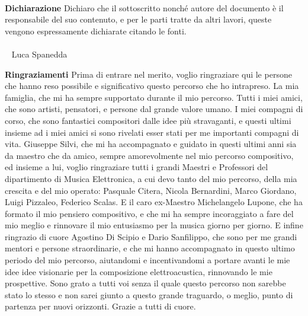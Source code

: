 \documentclass[12pt]{article}
\begin{document}


\newpage
\
\newpage

\vfill
\LARGE \textbf{Dichiarazione} \normalsize \newline \newline
Dichiaro che il sottoscritto nonché autore del
documento è il responsabile del suo contenuto,
e per le parti tratte da altri lavori,
queste vengono espressamente dichiarate
citando le fonti. \\  \\
\
\hspace*{\fill} \large Luca Spanedda \normalsize
\
\newpage

\vfill
\LARGE \textbf{Ringraziamenti} \normalsize \newline \newline
Prima di entrare nel merito, voglio ringraziare qui le persone
che hanno reso possibile e significativo questo percorso che ho intrapreso.
La mia famiglia, che mi ha sempre supportato durante il mio percorso.
Tutti i miei amici, che sono artisti, pensatori, e persone dal grande valore umano.
I miei compagni di corso, che sono fantastici compositori dalle idee più stravaganti,
e questi ultimi insieme ad i miei amici si sono rivelati esser
stati per me importanti compagni di vita.
Giuseppe Silvi, che mi ha accompagnato e guidato in questi ultimi anni sia da maestro
che da amico, sempre amorevolmente nel mio percorso compositivo,
ed insieme a lui, voglio ringraziare tutti i grandi Maestri e Professori
del dipartimento di Musica Elettronica,
a cui devo tanto del mio percorso, della mia crescita e del mio operato:
Pasquale Citera, Nicola Bernardini, Marco Giordano, Luigi Pizzaleo, Federico Scalas.
E il caro ex-Maestro Michelangelo Lupone, che ha formato il mio pensiero compositivo,
e che mi ha sempre incoraggiato a fare del mio meglio e rinnovare il mio entusiasmo
per la musica giorno per giorno.
E infine ringrazio di cuore Agostino Di Scipio e Dario Sanfilippo,
che sono per me grandi mentori e persone straordinarie,
e che mi hanno accompagnato in questo ultimo periodo del mio percorso,
aiutandomi e incentivandomi a portare avanti le
mie idee idee visionarie per la composizione elettroacustica,
rinnovando le mie prospettive.
Sono grato a tutti voi senza il quale questo percorso non sarebbe stato lo stesso
e non sarei giunto a questo grande traguardo,
o meglio, punto di partenza per nuovi orizzonti.
Grazie a tutti di cuore.
\newpage
\
\newpage
\end{document}
